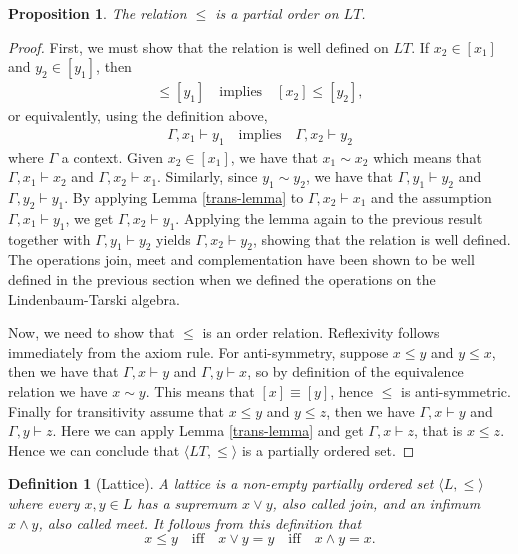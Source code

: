 \documentclass[titlepage]{article}
\newtheorem{definition}{Definition}[section]
\newtheorem{proposition}{Proposition}
\begin{document}
\begin{proposition}
    The relation $\leq$ is a partial order on $LT$.
\end{proposition}

\begin{proof}
    First, we must show that the relation is well defined on $LT$. If $x_2 \in [x_1]$ and $y_2\in [y_1]$, then 
    \begin{align*}
        [x_1] \leq [y_1] \quad \text{implies} \quad [x_2] \leq [y_2],
    \end{align*}
    or equivalently, using the definition above,
    \begin{align*}
        \Gamma, x_1 \vdash y_1 \quad \text{implies} \quad \Gamma, x_2 \vdash y_2
    \end{align*}
    where $\Gamma$ a context. Given $x_2 \in [x_1]$, we have that $x_1 \sim x_2$ which means that $\Gamma, x_1 \vdash x_2$ and $\Gamma, x_2 \vdash x_1$. Similarly, since $y_1 \sim y_2$, we have that $\Gamma, y_1 \vdash y_2$ and $\Gamma, y_2 \vdash y_1$. By applying Lemma \ref{trans-lemma} to $\Gamma, x_2 \vdash x_1$ and the assumption $\Gamma, x_1 \vdash y_1$, we get $\Gamma, x_2 \vdash y_1$. Applying the lemma again to the previous result together with $\Gamma, y_1 \vdash y_2$ yields $\Gamma, x_2 \vdash y_2$, showing that the relation is well defined. The operations join, meet and complementation have been shown to be well defined in the previous section when we defined the operations on the Lindenbaum-Tarski algebra.

    Now, we need to show that $\leq$ is an order relation. Reflexivity follows immediately from the axiom rule. For anti-symmetry, suppose $x \leq y$ and $y \leq x$, then we have that $\Gamma, x \vdash y$ and $\Gamma, y \vdash x$, so by definition of the equivalence relation we have $x \sim y$. This means that $[x] \equiv [y]$, hence $\leq$ is anti-symmetric. Finally for transitivity assume that $x \leq y$ and $y \leq z$, then we have $\Gamma, x \vdash y$ and $\Gamma, y \vdash z$. Here we can apply Lemma \ref{trans-lemma} and get $\Gamma, x \vdash z$, that is $x \leq z$. Hence we can conclude that $\langle LT, \leq \rangle$ is a partially ordered set.
\end{proof}


\begin{definition}[Lattice]\label{lattice}
    A lattice is a non-empty partially ordered set $\langle L, \leq \rangle$ where every $x,y \in L$ has a supremum $x\vee y$, also called join, and an infimum $x \wedge y$, also called meet. It follows from this definition that
    $$x \leq y \quad \text{iff} \quad x \vee y = y \quad \text{iff} \quad x \wedge y = x.$$
\end{definition}
\end{document}
